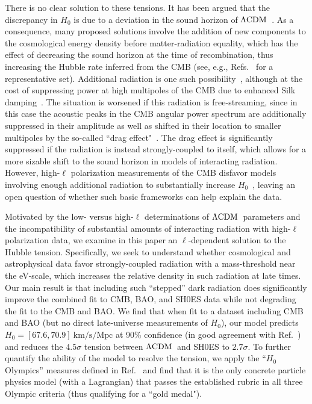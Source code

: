 \documentclass[aps,prd,twocolumn,nofootinbib,superscriptaddress]{revtex4}
\newcommand{\ksm}{\text{km} / \text{s} / \text{Mpc}}
\def\lcdm{$\Lambda{\rm CDM}$}
\begin{document}
There is no clear solution to these tensions. It has been argued that the discrepancy in $H_0$ is due to a deviation in the sound horizon of \lcdm~\cite{Bernal:2016gxb,Aylor:2018drw}. As a consequence, many proposed solutions involve the addition of new components to the cosmological energy density before matter-radiation equality, which has the effect of decreasing the sound horizon at the time of recombination, thus increasing the Hubble rate inferred from the CMB (see, e.g., Refs.~\cite{Brust:2017nmv,Blinov:2020hmc,RoyChoudhury:2020dmd,Brinckmann:2020bcn,Kreisch:2019yzn,Escudero:2019gvw,EscuderoAbenza:2020egd,Escudero:2021rfi,Karwal:2016vyq,Poulin:2018cxd,Lin:2019qug,Smith:2019ihp,Bansal:2021dfh,Cyr-Racine:2021alc,Niedermann:2020dwg} for a representative set).  Additional radiation is one such possibility~\cite{Bernal:2016gxb, Blinov:2020hmc, RoyChoudhury:2020dmd,Brinckmann:2020bcn,Kreisch:2019yzn}, although at the cost of suppressing power at high multipoles of the CMB due to enhanced Silk damping~\cite{Hou:2011ec}. The situation is worsened if this radiation is free-streaming, since in this case the acoustic peaks in the CMB angular power spectrum are additionally suppressed in their amplitude as well as shifted in their location to smaller multipoles   by the so-called ``drag effect"~\cite{Bashinsky:2003tk,Baumann:2015rya,Follin:2015hya}. The drag effect is significantly suppressed if the radiation is instead strongly-coupled to itself, which allows for a more sizable shift to the sound horizon in models of interacting radiation. However, high-$\ell$ polarization measurements of the CMB disfavor models involving enough additional radiation to substantially increase $H_0$~\cite{Bernal:2016gxb, Blinov:2020hmc, RoyChoudhury:2020dmd, Brinckmann:2020bcn}, leaving an open question of whether such basic frameworks can help explain the data.


Motivated by the low- versus high-$\ell$ determinations of \lcdm\ parameters and the incompatibility of substantial amounts of interacting radiation with high-$\ell$ polarization data, we examine in this paper an $\ell$-dependent solution to the Hubble tension. Specifically, we seek to understand whether cosmological and astrophysical data favor strongly-coupled radiation with a mass-threshold near the eV-scale, which increases the relative density in such radiation at late times. Our main result is that including such ``stepped'' dark radiation does significantly improve the combined fit to CMB, BAO, and SH0ES data while not degrading the fit to the CMB and BAO. We find that when fit to a dataset including CMB and BAO (but no direct late-universe measurements of $H_0$), our model predicts $H_0 = [67.6,70.9] \ \ksm$ at 90\% confidence (in good agreement with Ref.~\cite{Freedman:2019jwv}) and reduces the $4.5 \sigma$ tension between \lcdm\ and SH0ES to $2.7 \sigma$. To further quantify the ability of the model to resolve the tension, we apply the ``$H_0$ Olympics'' measures defined in Ref.~\cite{Schoneberg:2021qvd} and find that it is the only concrete particle physics model (with a Lagrangian) that passes the established rubric in all three Olympic criteria (thus qualifying for a ``gold medal").
\end{document}
